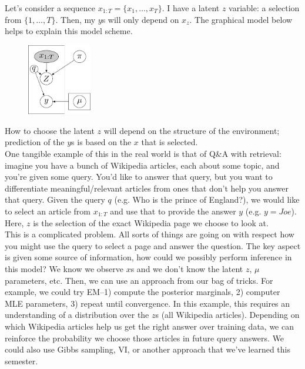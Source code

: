\documentclass{article}
\begin{document}
Let's consider a sequence $x_{1:T} = \{x_1,\ldots,x_T\}$. I have a latent $z$ variable: a selection from $\{1,\ldots,T\}$. Then, my $y$s will only depend on $x_z$. The graphical model below helps to explain this model scheme.

\begin{figure}[h]
    \centering
    \includegraphics[width=0.25\textwidth]{figs/translation_dgm.pdf}
    \caption{}
    \label{fig:trans_dgm}
\end{figure}

How to choose the latent $z$ will depend on the structure of the environment; prediction of the $y$s is based on the $x$ that is selected.\\

One tangible example of this in the real world is that of Q&A with retrieval: imagine you have a bunch of Wikipedia articles, each about some topic, and you're given some query. You'd like to answer that query, but you want to differentiate meaningful/relevant articles from ones that don't help you answer that query. Given the query $q$ (e.g. Who is the prince of England?), we would like to select an article from $x_{1:T}$ and use that to provide the answer $y$ (e.g. $y = Joe$). Here, $z$ is the selection of the exact Wikipedia page we choose to look at.\\

This is a complicated problem. All sorts of things are going on with respect how you might use the query to select a page and answer the question. The key aspect is given some source of information, how could we possibly perform inference in this model? We know we observe $x$s and we don't know the latent $z$, $\mu$ parameters, etc. Then, we can use an approach from our bag of tricks. For example, we could try EM--1) compute the posterior marginals, 2) computer MLE parameters, 3) repeat until convergence. In this example, this requires an understanding of a distribution over the $z$s (all Wikipedia articles). Depending on which Wikipedia articles help us get the right answer over training data, we can reinforce the probability we choose those articles in future query answers. We could also use Gibbs sampling, VI, or another approach that we've learned this semester.
\end{document}
